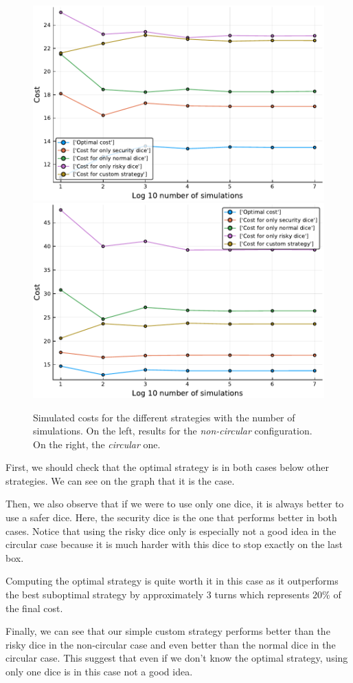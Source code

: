 \begin{figure}[H]
\centering
\includegraphics[scale=0.553]{../img/board_unif_low/cost_subopt_log_noncirc.pdf}
\includegraphics[scale=0.553]{../img/board_unif_low/cost_subopt_log_circ.pdf}
\caption{Simulated costs for the different strategies with the number of simulations. On the left, results for the \emph{non-circular} configuration. On the right, the \emph{circular} one.}
\label{fig:cost_subopt_log}
\end{figure}

First, we should check that the optimal strategy is in both cases below other strategies. 
We can see on the graph that it is the case.

Then, we also observe that if we were to use only one dice, it is always better to use a safer dice. 
Here, the security dice is the one that performs better in both cases. 
Notice that using the risky dice only is especially not a good idea in the circular case
because it is much harder with this dice to stop exactly on the last box.

Computing the optimal strategy is quite worth it in this case as it outperforms the best suboptimal strategy by approximately 3 turns which represents $20\%$ of the final cost.

Finally, we can see that our simple custom strategy performs better 
than the risky dice in the non-circular case 
and even better than the normal dice in the circular case. 
This suggest that even if we don't know the optimal strategy,
using only one dice is in this case not a good idea.  
